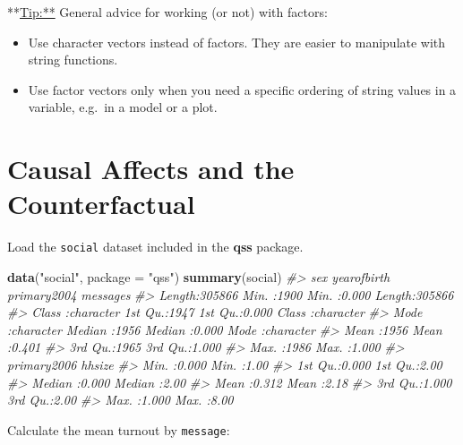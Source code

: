\documentclass[]{book}
\newenvironment{Shaded}{\begin{snugshade}}{\end{snugshade}}
\newcommand{\KeywordTok}[1]{\textcolor[rgb]{0.13,0.29,0.53}{\textbf{#1}}}
\newcommand{\DataTypeTok}[1]{\textcolor[rgb]{0.13,0.29,0.53}{#1}}
\newcommand{\StringTok}[1]{\textcolor[rgb]{0.31,0.60,0.02}{#1}}
\newcommand{\CommentTok}[1]{\textcolor[rgb]{0.56,0.35,0.01}{\textit{#1}}}
\newcommand{\OperatorTok}[1]{\textcolor[rgb]{0.81,0.36,0.00}{\textbf{#1}}}
\newcommand{\NormalTok}[1]{#1}
\providecommand{\tightlist}{%
  \setlength{\itemsep}{0pt}\setlength{\parskip}{0pt}}
\theoremstyle{definition}
\theoremstyle{definition}
\theoremstyle{definition}
\theoremstyle{remark}
\begin{document}
**\url{Tip:**} General advice for working (or not) with factors:

\begin{itemize}
\tightlist
\item
  Use character vectors instead of factors. They are easier to
  manipulate with string functions.
\item
  Use factor vectors only when you need a specific ordering of string
  values in a variable, e.g.~in a model or a plot.
\end{itemize}

\section{Causal Affects and the
Counterfactual}\label{causal-affects-and-the-counterfactual}

Load the \texttt{social} dataset included in the \textbf{qss} package.

\begin{Shaded}
\begin{Highlighting}[]
\KeywordTok{data}\NormalTok{(}\StringTok{"social"}\NormalTok{, }\DataTypeTok{package =} \StringTok{"qss"}\NormalTok{)}
\KeywordTok{summary}\NormalTok{(social)}
\CommentTok{#>      sex             yearofbirth    primary2004      messages        }
\CommentTok{#>  Length:305866      Min.   :1900   Min.   :0.000   Length:305866     }
\CommentTok{#>  Class :character   1st Qu.:1947   1st Qu.:0.000   Class :character  }
\CommentTok{#>  Mode  :character   Median :1956   Median :0.000   Mode  :character  }
\CommentTok{#>                     Mean   :1956   Mean   :0.401                     }
\CommentTok{#>                     3rd Qu.:1965   3rd Qu.:1.000                     }
\CommentTok{#>                     Max.   :1986   Max.   :1.000                     }
\CommentTok{#>   primary2006        hhsize    }
\CommentTok{#>  Min.   :0.000   Min.   :1.00  }
\CommentTok{#>  1st Qu.:0.000   1st Qu.:2.00  }
\CommentTok{#>  Median :0.000   Median :2.00  }
\CommentTok{#>  Mean   :0.312   Mean   :2.18  }
\CommentTok{#>  3rd Qu.:1.000   3rd Qu.:2.00  }
\CommentTok{#>  Max.   :1.000   Max.   :8.00}
\end{Highlighting}
\end{Shaded}

Calculate the mean turnout by \texttt{message}:

\begin{Shaded}
\end{Shaded}
\end{document}
